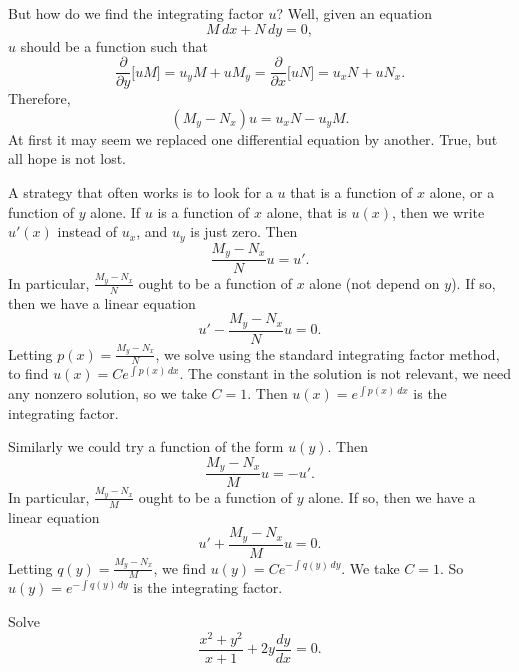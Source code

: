 \documentclass{ximera}
\begin{document}
But how do we find the integrating factor $u$?  Well, given an equation
\begin{equation*}
    M \, dx + N \, dy = 0 ,
\end{equation*}
$u$ should be a function such that
\begin{equation*}
    \frac{\partial}{\partial y} \bigl[ u M \bigr] = u_y M + u M_y =  \frac{\partial}{\partial x} \bigl[ u N \bigr] = u_x N + u N_x .
\end{equation*}
Therefore,
\begin{equation*}
    (M_y-N_x)u = u_x N - u_y M .
\end{equation*}
At first it may seem we replaced one differential equation by another. True, but all hope is not lost.

A strategy that often works is to look for a $u$ that is a function of $x$ alone, or a function of $y$ alone.  If $u$ is a function of $x$ alone, that is $u(x)$, then we write $u'(x)$ instead of $u_x$, and $u_y$ is just zero. Then
\begin{equation*}
    \frac{M_y-N_x}{N}u = u' .
\end{equation*}
In particular, $\frac{M_y-N_x}{N}$ ought to be a function of $x$ alone (not depend on $y$).  If so, then we have a linear equation
\begin{equation*}
    u' - \frac{M_y-N_x}{N} u = 0 .
\end{equation*}
Letting $p(x) = \frac{M_y-N_x}{N}$, we solve using the standard integrating factor method, to find $u(x) = C e^{\int p(x) \, dx}$.  The constant in the solution is not relevant, we need any nonzero solution, so we take $C=1$. Then $u(x) = e^{\int p(x) \, dx}$ is the integrating factor.

Similarly we could try a function of the form $u(y)$. Then
\begin{equation*}
    \frac{M_y-N_x}{M} u = - u' .
\end{equation*}
In particular, $\frac{M_y-N_x}{M}$ ought to be a function of $y$ alone. If so, then we have a linear equation
\begin{equation*}
    u' + \frac{M_y-N_x}{M} u = 0 .
\end{equation*}
Letting $q(y) = \frac{M_y-N_x}{M}$, we find $u(y) = C e^{-\int q(y) \, dy}$.  We take $C=1$.  So $u(y) = e^{-\int q(y) \, dy}$ is the integrating factor.

\begin{example}
    Solve
    \begin{equation*}
        \frac{x^2+y^2}{x+1} + 2y \frac{dy}{dx} = 0 .
    \end{equation*}
\end{example}
\end{document}
